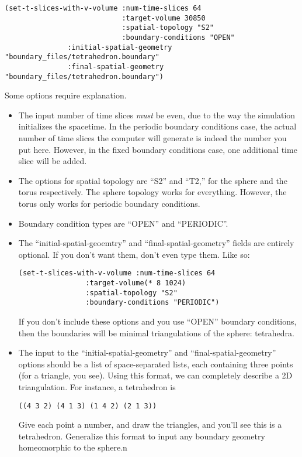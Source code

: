 \documentclass{article}
\begin{document}
\begin{lstlisting}
(set-t-slices-with-v-volume :num-time-slices 64
                            :target-volume 30850
                            :spatial-topology "S2"
                            :boundary-conditions "OPEN"
               :initial-spatial-geometry "boundary_files/tetrahedron.boundary"
               :final-spatial-geometry "boundary_files/tetrahedron.boundary")
\end{lstlisting}

Some options require explanation. 
\begin{itemize}
\item The input number of time slices \textit{must} be even, due to
  the way the simulation initializes the spacetime. In the periodic
  boundary conditions case, the actual number of time slices the
  computer will generate is indeed the number you put here. However,
  in the fixed boundary conditions case, one additional time slice
  will be added.
\item The options for spatial topology are ``S2'' and ``T2,'' for the
  sphere and the torus respectively. The sphere topology works for
  everything. However, the torus only works for periodic boundary
  conditions.
\item Boundary condition types are ``OPEN'' and ``PERIODIC''.
\item The ``initial-spatial-geoemtry'' and ``final-spatial-geometry''
  fields are entirely optional. If you don't want them, don't even
  type them. Like so:
\begin{lstlisting}
(set-t-slices-with-v-volume :num-time-slices 64
			    :target-volume(* 8 1024)
			    :spatial-topology "S2"
			    :boundary-conditions "PERIODIC")
\end{lstlisting}
If you don't include these options and you use ``OPEN'' boundary
conditions, then the boundaries will be minimal triangulations of the
sphere: tetrahedra.
\item The input to the ``initial-spatial-geometry'' and
  ``final-spatial-geometry'' options should be a list of
  space-separated lists, each containing three points (for a triangle,
  you see). Using this format, we can completely describe a 2D
  triangulation. For instance, a tetrahedron is
\begin{lstlisting}
((4 3 2) (4 1 3) (1 4 2) (2 1 3))
\end{lstlisting}
Give each point a number, and draw the triangles, and you'll see this
is a tetrahedron. Generalize this format to input any boundary
geometry homeomorphic to the sphere.n
\end{itemize}
\end{document}
